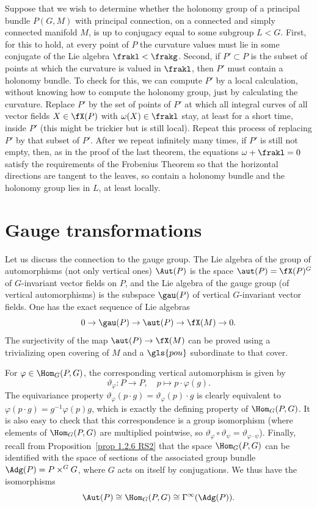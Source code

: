 \begin{rem}
    Suppose that we wish to determine whether the holonomy group of a principal bundle $P(G,M)$ with principal connection, on a connected and simply connected manifold $M$, is up to conjugacy equal to some subgroup $L<G$. First, for this to hold, at every point of $P$ the curvature values must lie in some conjugate of the Lie algebra $\frakl<\frakg$. Second, if $P'\subset P$ is the subset of points at which the curvature is valued in $\frakl$, then $P'$ must contain a holonomy bundle. To check for this, we can compute $P'$ by a local calculation, without knowing how to compute the holonomy group, just by calculating the curvature. Replace $P'$ by the set of points of $P'$ at which all integral curves of all vector fields $X\in\fX(P)$ with $\omega(X)\in\frakl$ stay, at least for a short time, inside $P'$ (this might be trickier but is still local). Repeat this process of replacing $P'$ by that subset of $P'$. After we repeat infinitely many times, if $P'$ is still not empty, then, as in the proof of the last theorem, the equations $\omega+\frakl=0$ satisfy the requirements of the Frobenius Theorem so that the horizontal directions are tangent to the leaves, so contain a holonomy bundle and the holonomy group lies in $L$, at least locally.
\end{rem}








\section{Gauge transformations}


Let us discuss the connection to the gauge group. The Lie algebra of the group of automorphisms (not only vertical ones) $\Aut(P)$ is the space $\aut(P)=\fX(P)^G$ of $G$-invariant vector fields on $P$, and the Lie algebra of the gauge group (of vertical automorphisms) is the subspace $\gau(P)$ of vertical $G$-invariant vector fields. One has the exact sequence of Lie algebras
\[0\to \gau(P)\to \aut(P)\to \fX(M)\to 0.\]
The surjectivity of the map $\aut(P)\to \fX(M)$ can be proved using a trivializing open covering of $M$ and a $\gls{pou}$ subordinate to that cover. 


For $\varphi\in \Hom_G(P,G)$, the corresponding vertical automorphism is given by
\[\vartheta_\varphi:P\to P,\quad p\mapsto p\cdot \varphi(g).\label{eq 1.8.2 RS2}\]
The equivariance property $\vartheta_\varphi(p\cdot g)=\vartheta_\varphi(p)\cdot g$ is clearly equivalent to $\varphi(p\cdot g)=g^{-1}\varphi(p)g$, which is exactly the defining property of $\Hom_G(P,G)$. It is also easy to check that this correspondence is a group isomorphism (where elements of $\Hom_G(P,G)$ are multiplied pointwise, so $\vartheta_\varphi\circ\vartheta_\psi=\vartheta_{\varphi\cdot\psi}$). Finally, recall from Proposition~\ref{prop 1.2.6 RS2} that the space $\Hom_G(P,G)$ can be identified with the space of sections of the associated group bundle $\Adg(P)=P\times^G G$, where $G$ acts on itself by conjugations. We thus have the isomorphisms
\[\Aut(P)\cong \Hom_G(P,G)\cong \Gamma^\infty(\Adg(P)).\]

